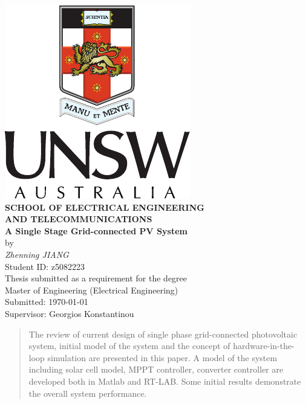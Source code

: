 \begin{center}
\includegraphics{PortraitColourPos-eps-converted-to}\\[0.5cm]
\textbf{\large SCHOOL OF ELECTRICAL ENGINEERING\\
AND TELECOMMUNICATIONS}\\[2cm]
{\addtolength{\baselineskip}{0.5cm}
\textbf{\Huge
A Single Stage Grid-connected PV System} \\[0.5cm]
}
{\Large by}\\[0.5cm]
\textit{\huge
Zhenning JIANG}\\[0.5cm]
{\Large
Student ID: z5082223}\\[1.5cm]
{\Large
Thesis submitted as a requirement for the degree\\
Master of Engineering (Electrical Engineering)\\[2ex]
\vfill
Submitted: \today\\
Supervisor: Georgios Konstantinou
\vspace*{-1cm}
}
\end{center}

\begin{abstract}
The review of current design of single phase grid-connected photovoltaic system, initial model of the system and the concept of hardware-in-the-loop simulation are presented in this paper. A model of the system including solar cell model, MPPT controller, converter controller are developed both in Matlab and RT-LAB. Some initial results demonstrate the overall system performance. 
\end{abstract}
